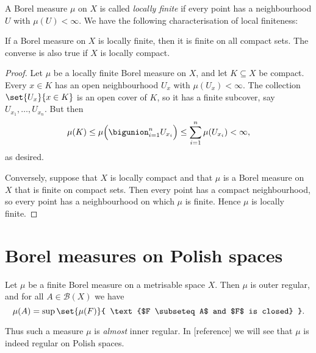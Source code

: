 \documentclass[article, a4paper, 11pt, oneside]{memoir}
\numberwithin{equation}{chapter}
\newcommand{\calB}{\mathcal{B}}
\newcommand{\borel}[1]{\calB(#1)}
\begin{document}
A Borel measure $\mu$ on $X$ is called \emph{locally finite} if every point has a neighbourhood $U$ with $\mu(U) < \infty$. We have the following characterisation of local finiteness:

\begin{proposition}
    \label{thm:local-finiteness-compacts}
    If a Borel measure on $X$ is locally finite, then it is finite on all compact sets. The converse is also true if $X$ is locally compact.
\end{proposition}

\begin{proof}
    Let $\mu$ be a locally finite Borel measure on $X$, and let $K \subseteq X$ be compact. Every $x \in K$ has an open neighbourhood $U_x$ with $\mu(U_x) < \infty$. The collection $\set{U_x}{x \in K}$ is an open cover of $K$, so it has a finite subcover, say $U_{x_1}, \ldots, U_{x_n}$. But then
    \begin{equation*}
        \mu(K)
            \leq \mu \Bigl( \bigunion_{i=1}^n U_{x_i} \Bigr)
            \leq \sum_{i=1}^n \mu(U_{x_i})
            < \infty,
    \end{equation*}
    as desired.

    Conversely, suppose that $X$ is locally compact and that $\mu$ is a Borel measure on $X$ that is finite on compact sets. Then every point has a compact neighbourhood, so every point has a neighbourhood on which $\mu$ is finite. Hence $\mu$ is locally finite.
\end{proof}


\section{Borel measures on Polish spaces}

\begin{lemma}
    \label{thm:metrisable-almost-regular}
    Let $\mu$ be a finite Borel measure on a metrisable space $X$. Then $\mu$ is outer regular, and for all $A \in \borel{X}$ we have
    \begin{equation}
        \label{eq:closed-inner-regularity}
        \mu(A)
            = \sup \set{\mu(F)}{ \text{$F \subseteq A$ and $F$ is closed} }.
    \end{equation}
\end{lemma}
%
Thus such a measure $\mu$ is \emph{almost} inner regular. In [reference] we will see that $\mu$ is indeed regular on Polish spaces.

\newcommand{\calA}{\mathcal{A}}
\end{document}
